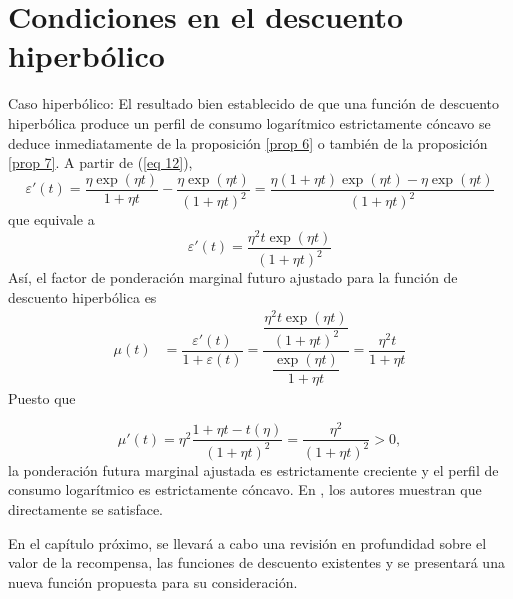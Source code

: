 \section{Condiciones en el descuento hiperbólico}
\begin{exmpl}\label{ex 8}
Caso hiperbólico: El resultado bien establecido de que una función de descuento hiperbólica produce un perfil de consumo logarítmico estrictamente cóncavo se deduce inmediatamente de la proposición \ref{prop 6} o también de la proposición \ref{prop 7}.
\noindent A partir de (\ref{eq 12}),
$$\varepsilon'(t)= \dfrac{\eta \exp (\eta t)}{1+ \eta t} - \dfrac{\eta \exp (\eta t)}{(1+ \eta t)^2} = \dfrac{\eta (1+ \eta t)\exp (\eta t) -\eta \exp (\eta t)}{(1+ \eta t)^2}$$
\noindent que equivale a
\begin{equation}
\label{eq 87}
    \varepsilon'(t)= \dfrac{\eta^2 t \exp(\eta t)}{(1+ \eta t)^2}
\end{equation}
\noindent Así, el factor de ponderación marginal futuro ajustado para la función de descuento hiperbólica es
\begin{align}
\label{eq 88}
    \mu(t) &= \dfrac{\varepsilon'(t)}{1+ \varepsilon(t)} = \dfrac{\dfrac{\eta^2 t \exp (\eta t)}{(1+ \eta t)^2}}{\dfrac{\exp(\eta t)}{1+ \eta t}} = \dfrac{\eta^2 t}{1+ \eta t}
\end{align}
%
\noindent Puesto que

$$\mu'(t) = \eta^2  \dfrac{1+ \eta t -t(\eta)}{(1+\eta t)^2}= \dfrac{\eta^2}{(1+\eta t)^2}>0,$$
la ponderación futura marginal ajustada es estrictamente creciente y el perfil de consumo logarítmico es estrictamente cóncavo. En \parencite{feigenbaum2021deviation}, los autores muestran que directamente se satisface.
\end{exmpl}

En el capítulo próximo, se llevará a cabo una revisión en profundidad sobre el valor de la recompensa, las funciones de descuento existentes y se presentará una nueva función propuesta para su consideración.